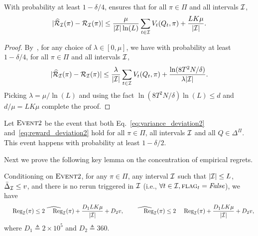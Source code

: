 \begin{lemma}\label{lem:reward_deviation2}
With probability at least $1 - \delta/4$, \AdaILTCB ensures that for all $\pi \in \Pi$
and all intervals ${\mathcal{I}}$, 
\begin{equation}\label{eq:reward_deviation2}
|\widehat{\cal{R}}_{\mathcal{I}}(\pi) - {\mathcal{R}}_{\mathcal{I}}(\pi)| \leq \frac{\mu}{|{\mathcal{I}}|\ln(L)} \sum_{t\in{\mathcal{I}}} V_t(Q_t, \pi) + \frac{LK\mu}{|{\mathcal{I}}|}.
\end{equation}
\end{lemma}

\begin{proof}
By~\citep[Lemma 11]{AgarwalHsKaLaLiSc14}, for any choice of $\lambda \in [0, \mu]$, 
we have with probability at least $1 - \delta/4$, for all $\pi \in \Pi$
and all intervals ${\mathcal{I}}$,
\[
|\widehat{\cal{R}}_{\mathcal{I}}(\pi) - {\mathcal{R}}_{\mathcal{I}}(\pi)| \leq \frac{\lambda}{|{\mathcal{I}}|} \sum_{t\in{\mathcal{I}}} V_t(Q_t, \pi) + \frac{\ln(8T^2N/\delta)}{\lambda|{\mathcal{I}}|}.
\]
Picking $\lambda = \mu/\ln(L)$ and using the fact $\ln(8T^2N/\delta)\ln(L) \leq d$ and $d/\mu = LK\mu$ complete the proof.
\end{proof}

\begin{definition}[$\evt 2$]
Let $\evt 2$ be the event that both Eq.~\eqref{eq:variance_deviation2} and~\eqref{eq:reward_deviation2} hold
for all $\pi \in \Pi$, all intervals ${\mathcal{I}}$ and all $Q \in \Delta^\Pi$. This event happens with probability at least $1-\delta/2$.
\end{definition}

Next we prove the following key lemma on the concentration of empirical regrets.

\begin{lemma}\label{lem:regret_deviation2}
Conditioning on $\evt 2$, for any $\pi \in \Pi$, any interval ${\mathcal{I}}$ such that $|{\mathcal{I}}|\leq L$, $\bar{\Delta}_{\mathcal{I}}\leq v$, and there is no rerun triggered in ${\mathcal{I}}$ (i.e., $\forall t\in {\mathcal{I}}, \textsc{flag}_t=\textit{False}$), we have
\begin{equation}\label{eq:regret_deviation2}
\Reg_\calI(\pi) \leq 2\whReg_{\calI}(\pi) + \frac{D_1LK\mu}{|\calI|} + D_2v,
\qquad
\whReg_{\calI}(\pi) \leq 2\Reg_\calI(\pi) + \frac{D_1LK\mu}{|\calI|} + D_2v, 
\end{equation}
where $D_1 \triangleq 2\times 10^5$ and $D_2\triangleq 360$. 
\end{lemma}

